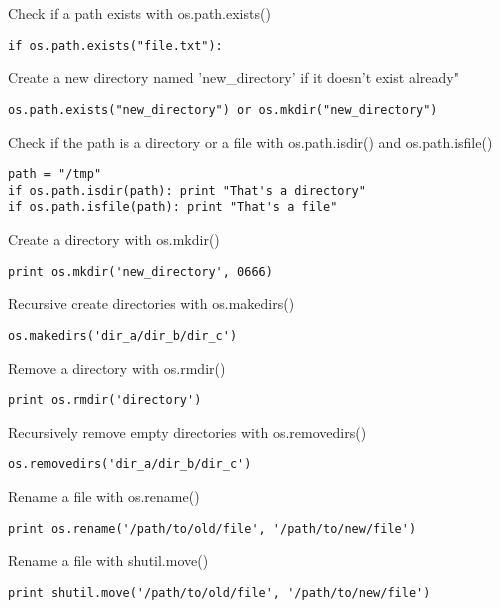 \documentclass[justified,sixbynine]{tufte-book}
\theoremstyle{plain}%
\theoremstyle{definition}
\theoremstyle{remark}
\begin{document}
\begin{fullwidth}
Check if a path exists with os.path.exists()

\begin{lstlisting}
if os.path.exists("file.txt"):
\end{lstlisting}

Create a new directory named 'new\_directory' if it doesn't exist already"

\begin{lstlisting}
os.path.exists("new_directory") or os.mkdir("new_directory")
\end{lstlisting}

Check if the path is a directory or a file with os.path.isdir() and os.path.isfile()

\begin{lstlisting}
path = "/tmp"
if os.path.isdir(path): print "That's a directory"
if os.path.isfile(path): print "That's a file"
\end{lstlisting}

Create a directory with os.mkdir()

\begin{lstlisting}
print os.mkdir('new_directory', 0666)
\end{lstlisting}

Recursive create directories with os.makedirs()

\begin{lstlisting}
os.makedirs('dir_a/dir_b/dir_c')
\end{lstlisting}

Remove a directory with os.rmdir()
\begin{lstlisting}
print os.rmdir('directory')
\end{lstlisting}

Recursively remove empty directories with os.removedirs()

\begin{lstlisting}
os.removedirs('dir_a/dir_b/dir_c')
\end{lstlisting}
Rename a file with os.rename()

\begin{lstlisting}
print os.rename('/path/to/old/file', '/path/to/new/file')
\end{lstlisting}

Rename a file with shutil.move()

\begin{lstlisting}
print shutil.move('/path/to/old/file', '/path/to/new/file')
\end{lstlisting}


\end{fullwidth}
\end{document}
